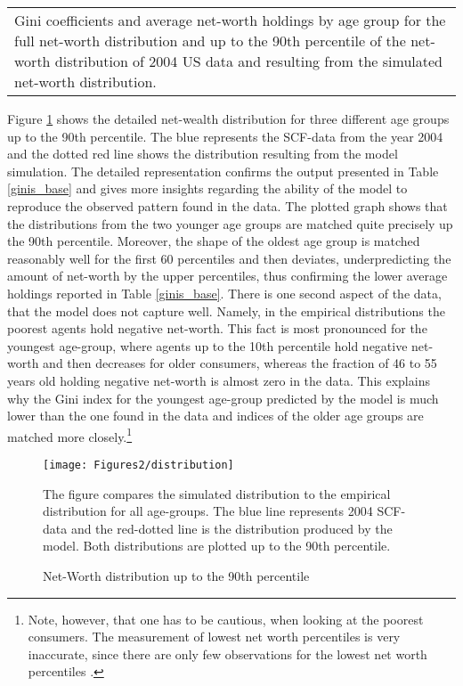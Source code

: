 \documentclass[a4paper,12pt,legno]{article}
\begin{document}
\begin{table}[!htbp]
\begin{tabular}{@{}lll@{}}
\multicolumn{3}{l}{%
  \begin{minipage}{8.5cm}%
    \small Gini coefficients and average net-worth holdings by age group for the full net-worth distribution and up to the 90th percentile of the net-worth distribution of 2004 US data and resulting from the simulated net-worth distribution. 
  \end{minipage}%
}\\
\end{tabular}
\end{table}

Figure \ref{wealth_distr_base} shows the detailed net-wealth distribution for three different age groups up to the 90th percentile. The blue represents the SCF-data from the year 2004 and the dotted red line shows the distribution resulting from the model simulation. The detailed representation confirms the output presented in Table \ref{ginis_base} and gives more insights regarding the ability of the model to reproduce the observed pattern found in the data.
The plotted graph shows that the distributions from the two younger age groups are matched quite precisely up the 90th percentile. Moreover, the shape of the oldest age group is matched reasonably well for the first 60 percentiles and then deviates, underpredicting the amount of net-worth by the upper percentiles, thus confirming the lower average holdings reported in Table \ref{ginis_base}. There is one second aspect of the data, that the model does not capture well. Namely, in the empirical distributions the poorest agents hold negative net-worth. This fact is most pronounced for the youngest age-group, where agents up to the 10th percentile hold negative net-worth and then decreases for older consumers, whereas the fraction of 46 to 55 years old holding negative net-worth is almost zero in the data. This explains why the Gini index for the youngest age-group predicted by the model is much lower than the one found in the data and indices of the older age groups are matched more closely.\footnote{Note, however, that one has to be cautious, when looking at the poorest consumers. The measurement of lowest net worth percentiles is very inaccurate, since there are only few observations for the lowest net worth percentiles \citep{hintermaier2011}.} 
\begin{figure}[!htbp]
\caption{Net-Worth distribution up to the 90th percentile} 
\label{wealth_distr_base}	%
\centering
\texttt{[image: Figures2/distribution]}  %

\begin{minipage}{0.8\linewidth}
\footnotesize{The figure compares the simulated distribution to the empirical distribution for all age-groups. The blue line represents 2004 SCF-data and the red-dotted line is the distribution produced by the model. Both distributions are plotted up to the 90th percentile.}
\end{minipage}

\end{figure}
\end{document}
